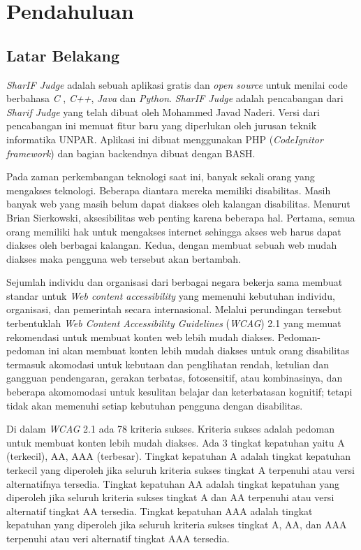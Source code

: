 \chapter{Pendahuluan}
\label{chap:intro}
   
\section{Latar Belakang}
\label{sec:label}
\textit{SharIF Judge} \cite{SharIF_Judge} adalah sebuah aplikasi gratis dan \textit{open source} untuk menilai code berbahasa \textit{C} , \textit{C++}, \textit{Java} dan \textit{Python}. \textit{SharIF Judge} adalah pencabangan dari \textit{Sharif Judge} \cite{Sharif_Judge_Original} yang telah dibuat oleh Mohammed Javad Naderi. Versi dari pencabangan ini memuat fitur baru yang diperlukan oleh jurusan teknik informatika UNPAR. Aplikasi ini dibuat menggunakan PHP (\textit{CodeIgnitor framework}) dan bagian backendnya dibuat dengan BASH.

Pada zaman perkembangan teknologi saat ini, banyak sekali orang yang mengakses teknologi. Beberapa diantara mereka memiliki disabilitas. Masih banyak web yang masih belum dapat diakses oleh kalangan disabilitas. Menurut Brian Sierkowski, aksesibilitas web penting karena beberapa hal. Pertama, semua orang memiliki hak untuk mengakses internet sehingga akses web harus dapat diakses oleh berbagai kalangan. Kedua, dengan membuat sebuah web mudah diakses maka pengguna web tersebut akan bertambah.

Sejumlah individu dan organisasi dari berbagai negara bekerja sama membuat standar untuk \textit{Web content accessibility} yang memenuhi kebutuhan individu, organisasi, dan pemerintah secara internasional. Melalui perundingan tersebut terbentuklah \textit{Web Content Accessibility Guidelines} (\textit{WCAG}) 2.1 \cite{WCAG:2.1} yang memuat rekomendasi untuk membuat konten web lebih mudah diakses. Pedoman-pedoman ini akan membuat konten lebih mudah diakses untuk orang disabilitas termasuk akomodasi untuk kebutaan dan penglihatan rendah, ketulian dan gangguan pendengaran, gerakan terbatas, fotosensitif, atau kombinasinya, dan beberapa akomomodasi untuk kesulitan belajar dan keterbatasan kognitif; tetapi tidak akan memenuhi setiap kebutuhan pengguna dengan disabilitas. 

Di dalam \textit{WCAG} 2.1 ada 78 kriteria sukses. Kriteria sukses adalah pedoman untuk membuat konten lebih mudah diakses. Ada 3 tingkat kepatuhan yaitu A (terkecil), AA, AAA (terbesar). Tingkat kepatuhan A adalah tingkat kepatuhan terkecil yang diperoleh jika seluruh kriteria sukses tingkat A terpenuhi atau versi alternatifnya tersedia. Tingkat kepatuhan AA adalah tingkat kepatuhan yang diperoleh jika seluruh kriteria sukses tingkat A dan AA terpenuhi atau versi alternatif tingkat AA tersedia. Tingkat kepatuhan AAA adalah tingkat kepatuhan yang diperoleh jika seluruh kriteria sukses tingkat A, AA, dan AAA terpenuhi atau veri alternatif tingkat AAA tersedia.


